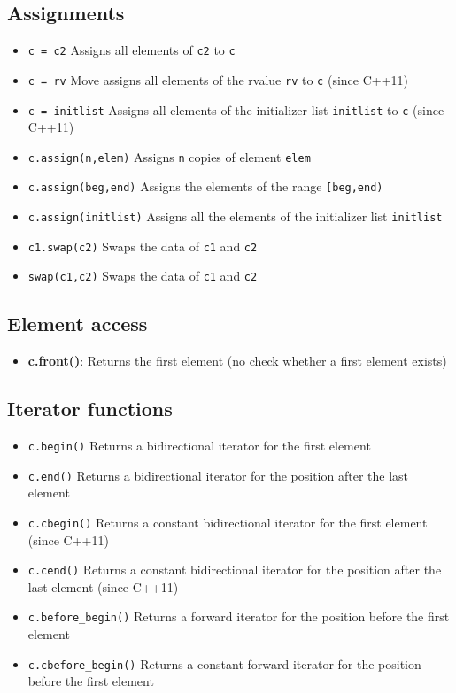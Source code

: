 \documentclass{report}
\begin{document}
\subsection{Assignments}
\begin{itemize}
    \item \texttt{c = c2} Assigns all elements of \texttt{c2} to \texttt{c}
    \item \texttt{c = rv} Move assigns all elements of the rvalue \texttt{rv} to \texttt{c} (since C++11)
    \item \texttt{c = initlist} Assigns all elements of the initializer list \texttt{initlist} to \texttt{c} (since C++11)
    \item \texttt{c.assign(n,elem)} Assigns \texttt{n} copies of element \texttt{elem}
    \item \texttt{c.assign(beg,end)} Assigns the elements of the range \texttt{[beg,end)}
    \item \texttt{c.assign(initlist)} Assigns all the elements of the initializer list \texttt{initlist}
    \item \texttt{c1.swap(c2)} Swaps the data of \texttt{c1} and \texttt{c2}
    \item \texttt{swap(c1,c2)} Swaps the data of \texttt{c1} and \texttt{c2}
\end{itemize}
\bigbreak \noindent 
\subsection{Element access}
\begin{itemize}
    \item \textbf{c.front()}: Returns the first element (no check whether a first element exists)
\end{itemize}

\bigbreak \noindent 
\subsection{Iterator functions}
\begin{itemize}
    \item \texttt{c.begin()} Returns a bidirectional iterator for the first element
    \item \texttt{c.end()} Returns a bidirectional iterator for the position after the last element
    \item \texttt{c.cbegin()} Returns a constant bidirectional iterator for the first element (since C++11)
    \item \texttt{c.cend()} Returns a constant bidirectional iterator for the position after the last element (since C++11)
    \item \texttt{c.before\_begin()} Returns a forward iterator for the position before the first element
    \item \texttt{c.cbefore\_begin()} Returns a constant forward iterator for the position before the first element
\end{itemize}
\end{document}
